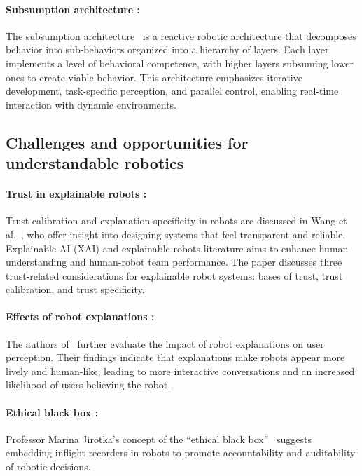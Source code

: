 \paragraph{Subsumption architecture :}
The subsumption architecture~\cite{subsumption} is a reactive robotic architecture that decomposes behavior into sub-behaviors organized into a hierarchy of layers.
Each layer implements a level of behavioral competence, with higher layers subsuming lower ones to create viable behavior.
This architecture emphasizes iterative development, task-specific perception, and parallel control, enabling real-time interaction with dynamic environments.

\subsection{Challenges and opportunities for understandable robotics}

\paragraph{Trust in explainable robots :}
Trust calibration and explanation-specificity in robots are discussed in Wang et al.~\cite{trust-explainable}, who offer insight into designing systems that feel transparent and reliable.
Explainable AI (XAI) and explainable robots literature aims to enhance human understanding and human-robot team performance.
The paper discusses three trust-related considerations for explainable robot systems: bases of trust, trust calibration, and trust specificity.

\paragraph{Effects of robot explanations :}
The authors of~\cite{explanations-effect} further evaluate the impact of robot explanations on user perception.
Their findings indicate that explanations make robots appear more lively and human-like, leading to more interactive conversations and an increased likelihood of users believing the robot.

\paragraph{Ethical black box :}
Professor Marina Jirotka’s concept of the “ethical black box”~\cite{ethical-black-box} suggests embedding inflight recorders in robots to promote accountability and auditability of robotic decisions.
